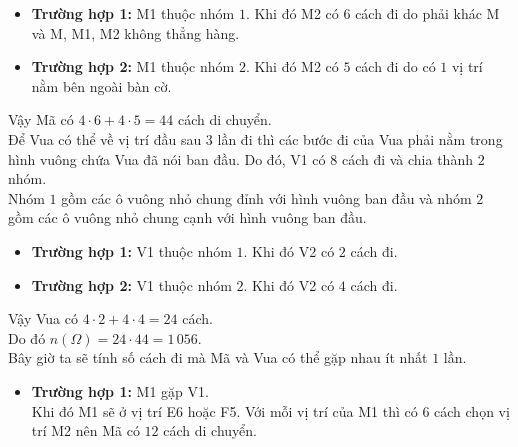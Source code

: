 \begin{ex}
{{
		}
		\begin{itemize}
			\item  \textbf{Trường hợp 1:} M1 thuộc nhóm $1$. Khi đó M2 có $6$ cách đi do phải khác M và M, M1, M2 không thẳng hàng.
			\item  \textbf{Trường hợp 2:} M1 thuộc nhóm $2$. Khi đó M2 có $5$ cách đi do có $1$ vị trí nằm bên ngoài bàn cờ.
		\end{itemize}
		Vậy Mã có $4 \cdot 6 + 4 \cdot 5 = 44$ cách di chuyển.\\
		Để Vua có thể về vị trí đầu sau $3$ lần đi thì các bước đi của Vua phải nằm trong hình vuông chứa Vua đã nói ban đầu. Do đó, V1 có $8$ cách đi và chia thành $2$ nhóm.\\
		Nhóm $1$ gồm các ô vuông nhỏ chung đỉnh với hình vuông ban đầu và nhóm $2$ gồm các ô vuông nhỏ chung cạnh với hình vuông ban đầu.
		\begin{itemize}
			\item  \textbf{Trường hợp 1:} V1 thuộc nhóm $1$. Khi đó V2 có $2$ cách đi.
			\item  \textbf{Trường hợp 2: } V1 thuộc nhóm $2$. Khi đó V2 có $4$ cách đi.
		\end{itemize}
		Vậy Vua có $4 \cdot 2 + 4 \cdot 4 = 24$ cách.\\
		Do đó $n(\Omega) = 24 \cdot 44 = 1\,056$.\\
		Bây giờ ta sẽ tính số cách đi mà Mã và Vua có thể gặp nhau ít nhất $1$ lần.
		\begin{itemize}
			\item \textbf{Trường hợp 1:} M1 gặp V1.\\
			Khi đó M1 sẽ ở vị trí E6 hoặc F5. Với mỗi vị trí của M1 thì có $6$ cách chọn vị trí M2 nên Mã có $12$ cách di chuyển.\\

\end{itemize}}
\end{ex}
